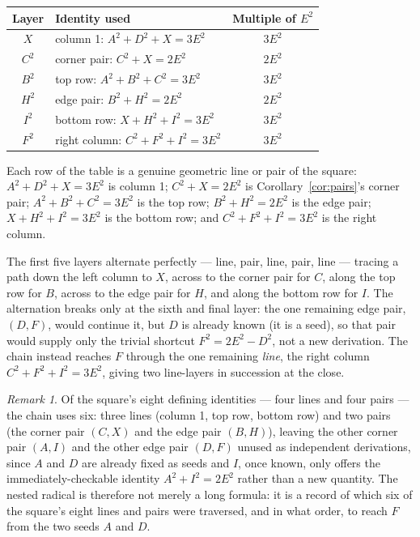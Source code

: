 \documentclass[12pt]{article}
\theoremstyle{remark}
\newtheorem{remark}[theorem]{Remark}
\begin{document}
\begin{center}
\begin{tabular}{clc}
\hline
Layer & Identity used & Multiple of $E^2$ \\
\hline
$X$   & column 1: $A^2+D^2+X=3E^2$        & $3E^2$ \\
$C^2$ & corner pair: $C^2+X=2E^2$          & $2E^2$ \\
$B^2$ & top row: $A^2+B^2+C^2=3E^2$        & $3E^2$ \\
$H^2$ & edge pair: $B^2+H^2=2E^2$          & $2E^2$ \\
$I^2$ & bottom row: $X+H^2+I^2=3E^2$       & $3E^2$ \\
$F^2$ & right column: $C^2+F^2+I^2=3E^2$   & $3E^2$ \\
\hline
\end{tabular}
\end{center}

Each row of the table is a genuine geometric line or pair of the
square: $A^2+D^2+X=3E^2$ is column 1; $C^2+X=2E^2$ is
Corollary~\ref{cor:pairs}'s corner pair; $A^2+B^2+C^2=3E^2$ is the top
row; $B^2+H^2=2E^2$ is the edge pair; $X+H^2+I^2=3E^2$ is the bottom
row; and $C^2+F^2+I^2=3E^2$ is the right column.

The first five layers alternate perfectly --- line, pair, line, pair,
line --- tracing a path down the left column to $X$, across to the
corner pair for $C$, along the top row for $B$, across to the edge
pair for $H$, and along the bottom row for $I$. The alternation breaks
only at the sixth and final layer: the one remaining edge pair,
$(D,F)$, would continue it, but $D$ is already known (it is a seed),
so that pair would supply only the trivial shortcut $F^2=2E^2-D^2$,
not a new derivation. The chain instead reaches $F$ through the one
remaining \emph{line}, the right column $C^2+F^2+I^2=3E^2$, giving two
line-layers in succession at the close.

\begin{remark}
Of the square's eight defining identities --- four lines and four
pairs --- the chain uses six: three lines (column 1, top row, bottom
row) and two pairs (the corner pair $(C,X)$ and the edge pair
$(B,H)$), leaving the other corner pair $(A,I)$ and the other edge
pair $(D,F)$ unused as independent derivations, since $A$ and $D$ are
already fixed as seeds and $I$, once known, only offers the
immediately-checkable identity $A^2+I^2=2E^2$ rather than a new
quantity. The nested radical is therefore not merely a long formula:
it is a record of which six of the square's eight lines and pairs
were traversed, and in what order, to reach $F$ from the two seeds
$A$ and $D$.
\end{remark}
\end{document}
